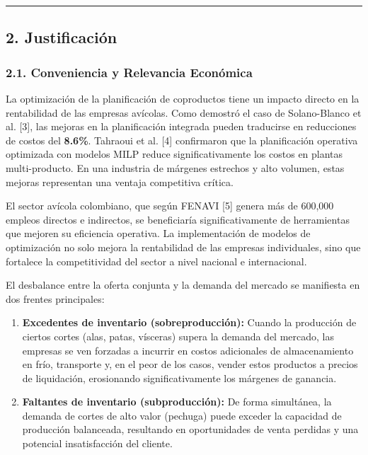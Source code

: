 \documentclass[
  spanish,
  12pt,
]{article}
\begin{document}
\begin{center}\rule{0.5\linewidth}{0.5pt}\end{center}

\subsection{2. Justificación}\label{justificaciuxf3n}

\subsubsection{2.1. Conveniencia y Relevancia
Económica}\label{conveniencia-y-relevancia-econuxf3mica}

La optimización de la planificación de coproductos tiene un impacto
directo en la rentabilidad de las empresas avícolas. Como demostró el
caso de Solano-Blanco et al. {[}3{]}, las mejoras en la planificación
integrada pueden traducirse en reducciones de costos del \textbf{8.6\%}.
Tahraoui et al. {[}4{]} confirmaron que la planificación operativa
optimizada con modelos MILP reduce significativamente los costos en
plantas multi-producto. En una industria de márgenes estrechos y alto
volumen, estas mejoras representan una ventaja competitiva crítica.

El sector avícola colombiano, que según FENAVI {[}5{]} genera más de
600,000 empleos directos e indirectos, se beneficiaría
significativamente de herramientas que mejoren su eficiencia operativa.
La implementación de modelos de optimización no solo mejora la
rentabilidad de las empresas individuales, sino que fortalece la
competitividad del sector a nivel nacional e internacional.

El desbalance entre la oferta conjunta y la demanda del mercado se
manifiesta en dos frentes principales:

\begin{enumerate}
\def\labelenumi{\arabic{enumi}.}
\item
  \textbf{Excedentes de inventario (sobreproducción):} Cuando la
  producción de ciertos cortes (alas, patas, vísceras) supera la demanda
  del mercado, las empresas se ven forzadas a incurrir en costos
  adicionales de almacenamiento en frío, transporte y, en el peor de los
  casos, vender estos productos a precios de liquidación, erosionando
  significativamente los márgenes de ganancia.
\item
  \textbf{Faltantes de inventario (subproducción):} De forma simultánea,
  la demanda de cortes de alto valor (pechuga) puede exceder la
  capacidad de producción balanceada, resultando en oportunidades de
  venta perdidas y una potencial insatisfacción del cliente.
\end{enumerate}
\end{document}
